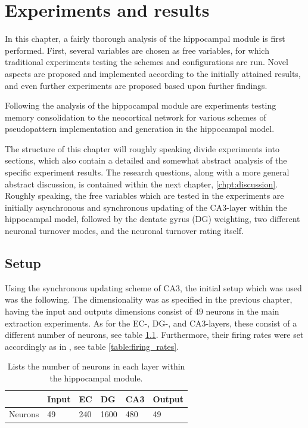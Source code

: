 
\chapter{Experiments and results}\label{chpt:experiments}

In this chapter, a fairly thorough analysis of the hippocampal module is first performed. First, several variables are chosen as free variables, for which traditional experiments testing the schemes and configurations are run. Novel aspects are proposed and implemented according to the initially attained results, and even further experiments are proposed based upon further findings. 

Following the analysis of the hippocampal module are experiments testing memory consolidation to the neocortical network for various schemes of pseudopattern implementation and generation in the hippocampal model.

The structure of this chapter will roughly speaking divide experiments into sections, which also contain a detailed and somewhat abstract analysis of the specific experiment results. The research questions, along with a more general abstract discussion, is contained within the next chapter, \ref{chpt:discussion}.
Roughly speaking, the free variables which are tested in the experiments are initially asynchronous and synchronous updating of the CA3-layer within the hippocampal model, followed by the dentate gyrus (DG) weighting, two different neuronal turnover modes, and the neuronal turnover rating itself.


\section{Setup}

Using the synchronous updating scheme of CA3, the initial setup which was used was the following. The dimensionality was as specified in the previous chapter, having the input and outputs dimensions consist of $49$ neurons in the main extraction experiments. As for the EC-, DG-, and CA3-layers, these consist of a different number of neurons, see table \ref{table:number_of_neurons}. Furthermore, their firing rates were set accordingly as in \citep{Hattori2014}, see table \ref{table:firing_rates}.

\begin{table}[]
\centering
\caption{Lists the number of neurons in each layer within the hippocampal module.}
\label{table:number_of_neurons}
\begin{tabular}{l|l|l|l|l|l|}
\cline{2-6}
                              & Input & EC  & DG   & CA3 & Output \\ \hline
\multicolumn{1}{|l|}{Neurons} & 49    & 240 & 1600 & 480 & 49     \\ \hline
\end{tabular}
\end{table}

